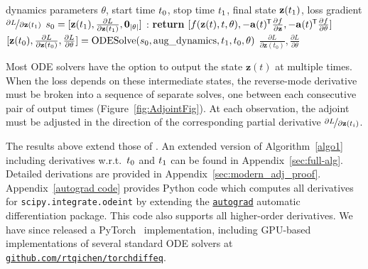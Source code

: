 \documentclass{article}
\newcommand*{\tran}{^{\mkern-1.5mu\mathsf{T}}}
\newcommand{\va}{\mathbf{a}}
\newcommand{\vz}{\mathbf{z}}
\newcommand{\vzero}{\bf{0}}
\newcommand{\sol}{\vz}  %
\newcommand{\solvefunc}{\textnormal{ODESolve}}
\newcommand{\tstart}{{t_\textnormal{0}}}
\newcommand{\tend}{{t_\textnormal{1}}}
\newcommand{\adj}{\va}
\begin{document}
\begin{algorithm}[h]
\caption{Reverse-mode derivative of an ODE initial value problem}
\label{algo1}
\begin{algorithmic}
\Require dynamics parameters $\theta$, start time $\tstart$, stop time $\tend$, final state $\sol(\tend)$, loss gradient $\nicefrac{\partial L}{\partial \sol(\tend)}$
\State $s_0 = [\sol(\tend), \frac{\partial L}{\partial \sol(\tend)}, {\vzero}_{|\theta|}]$ 
\Function{\textnormal{aug\_dynamics}}{$[\sol(t), \adj(t), \cdot], t, \theta$}: 
\State \textbf{return} $[f(\sol(t), t, \theta), -\adj(t)\tran{} \frac{\partial f}{\partial \sol}, -\adj(t)\tran{} \frac{\partial f}{\partial \theta}]$ 
\EndFunction %
\State $[\sol(t_0), \frac{\partial L}{\partial \sol(t_0)}, \frac{\partial L}{\partial \theta}] = \solvefunc(s_0, \textnormal{aug\_dynamics}, \tend, \tstart, \theta)$ 
\Ensure $\frac{\partial L}{\partial \sol(t_0)}, \frac{\partial L}{\partial \theta}$ 
\end{algorithmic}
\end{algorithm}


Most ODE solvers have the option to output the state $\sol(t)$ at multiple times.
When the loss depends on these intermediate states, the reverse-mode derivative must be broken into a sequence of separate solves, one between each consecutive pair of output times (Figure~\ref{fig:AdjointFig}).
At each observation, the adjoint must be adjusted in the direction of the corresponding partial derivative $\nicefrac{\partial L}{\partial \sol(t_i)}$.

The results above extend those of \citet[section 2.4.2]{stapor2018optimization}.
An extended version of Algorithm~\ref{algo1} including derivatives w.r.t.\ $\tstart$ and $\tend$ can be found in Appendix~\ref{sec:full-alg}.
Detailed derivations are provided in Appendix~\ref{sec:modern_adj_proof}.
Appendix~\ref{autograd code} provides Python code which computes all derivatives for \texttt{scipy.integrate.odeint} by extending the \href{https://www.github.com/HIPS/autograd}{\texttt{autograd}} automatic differentiation package.
This code also supports all higher-order derivatives.
We have since released a PyTorch~\citep{paszke2017automatic} implementation, including GPU-based implementations of several standard ODE solvers at \href{https://github.com/rtqichen/torchdiffeq}{\texttt{github.com/rtqichen/torchdiffeq}}.
\end{document}
